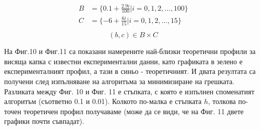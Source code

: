 \documentclass{article}
\begin{document}
\begin{align*}
\begin{split} 
B &= \{0.1 + \frac{2.9i}{100} | i = 0, 1, 2, ..., 100\}\\
C &= \{-6 + \frac{6i}{15} | i = 0, 1, 2, ..., 15\}\\
\end{split}
\end{align*}
$$(b,c) \in B \times C $$

На Фиг.10 и Фиг.11 са показани намерените най-близки теоретични профили за висяща капка с известни експериментални данни, като графиката в зелено е експерименталният профил, а тази в синьо - теоретичният. И двата резултата са получени след изпълняване на алгоритъма за минимизиране на грешката. Разликата между Фиг. 10 и Фиг. 11 е стъпката, с която е изпълнен споменатият алгоритъм (съответно 0.1 и 0.01). Колкото по-малка е стъпката \(h\), толкова по-точен теоретичен профил получаваме (може да се види, че на Фиг. 11 двете графики почти съвпадат).
\end{document}
